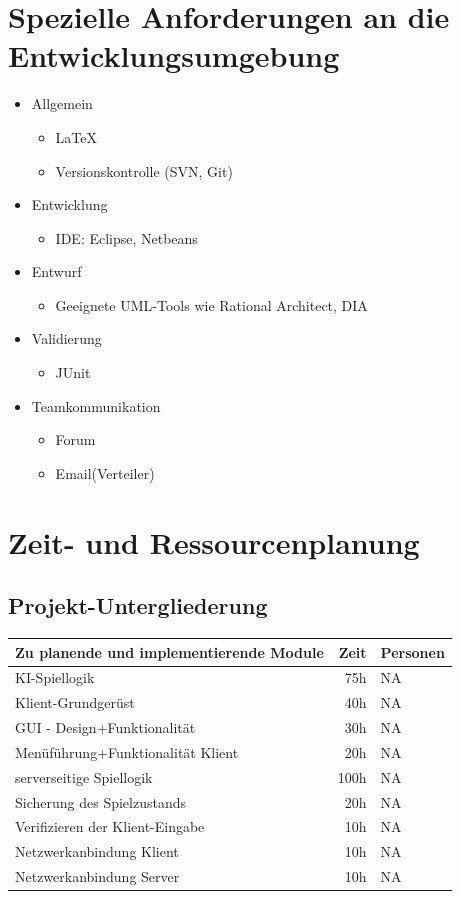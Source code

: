 \documentclass[a4paper,10pt]{article}
\begin{document}
\section{Spezielle Anforderungen an die Entwicklungsumgebung}
\begin{itemize}
\item Allgemein
\begin{itemize}
\item \LaTeX
\item Versionskontrolle (SVN, Git)
\end{itemize}
\item Entwicklung
\begin{itemize}
\item IDE: Eclipse, Netbeans
\end{itemize}
\item  Entwurf
\begin{itemize}
\item Geeignete UML-Tools wie Rational Architect, DIA
\end{itemize}
\item Validierung
\begin{itemize}
\item JUnit
\end{itemize}
\item Teamkommunikation
\begin{itemize}
\item Forum
\item Email(Verteiler)
\end{itemize}
\end{itemize}

\section{Zeit- und Ressourcenplanung}
\subsection{Projekt-Untergliederung}
\begin{tabular}[h]{l | r | l}
  \hline
  Zu planende und implementierende Module & Zeit & Personen\\
  \hline
  \hline
  KI-Spiellogik & 75h & NA\\
  Klient-Grundgerüst & 40h & NA\\
  GUI - Design+Funktionalität & 30h & NA\\
  Menüführung+Funktionalität Klient & 20h & NA\\
  serverseitige Spiellogik & 100h & NA\\
  Sicherung des Spielzustands & 20h & NA\\
  Verifizieren der Klient-Eingabe & 10h & NA\\
  Netzwerkanbindung Klient & 10h & NA\\
  Netzwerkanbindung Server & 10h & NA\\
  \hline
\end{tabular}
\end{document}
